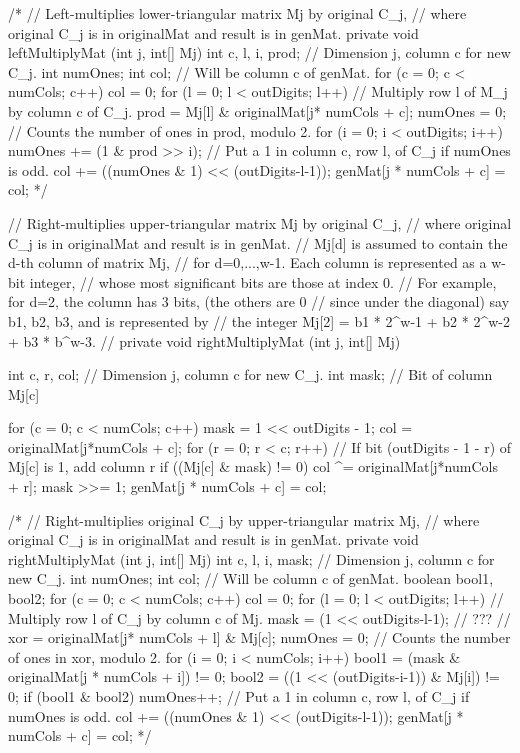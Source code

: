 \begin{code}
\begin{hide}
/*
   // Left-multiplies lower-triangular matrix Mj by original C_j,
   // where original C_j is in originalMat and result is in genMat.
   private void leftMultiplyMat (int j, int[] Mj) {
      int c, l, i, prod;    // Dimension j, column c for new C_j.
      int numOnes;
      int col;             // Will be column c of genMat.
      for (c = 0; c < numCols; c++) {
         col = 0;
         for (l = 0; l < outDigits; l++) {
            // Multiply row l of M_j by column c of C_j.
            prod = Mj[l] & originalMat[j* numCols + c];
            numOnes = 0;   // Counts the number of ones in prod, modulo 2.
            for (i = 0; i < outDigits; i++)
               numOnes += (1 & prod >> i);
            // Put a 1 in column c, row l, of C_j if numOnes is odd.
            col += ((numOnes & 1) << (outDigits-l-1));
         }
         genMat[j * numCols + c] = col;
      }
   }
*/

   // Right-multiplies upper-triangular matrix Mj by original C_j,
   // where original C_j is in originalMat and result is in genMat.
   // Mj[d] is assumed to contain the d-th column of matrix Mj,
   // for d=0,...,w-1. Each column is represented as a w-bit integer,
   // whose most significant bits are those at index 0.
   // For example, for d=2, the column has 3 bits, (the others are 0
   // since under the diagonal) say b1, b2, b3, and is represented by
   // the integer Mj[2] = b1 * 2^{w-1} + b2 * 2^{w-2} + b3 * b^{w-3}.
   //
   private void rightMultiplyMat (int j, int[] Mj) {
      int c, r, col;       // Dimension j, column c for new C_j.
      int mask;            // Bit of column Mj[c]

      for (c = 0; c < numCols; c++) {
         mask = 1 << outDigits - 1;
         col = originalMat[j*numCols + c];
         for (r = 0; r < c; r++) {
            // If bit (outDigits - 1 - r) of Mj[c] is 1, add column r
            if ((Mj[c] & mask) != 0)
               col ^= originalMat[j*numCols + r];
            mask >>= 1;
         }
         genMat[j * numCols + c] = col;
      }
   }

/*
   // Right-multiplies original C_j by upper-triangular matrix Mj,
   // where original C_j is in originalMat and result is in genMat.
   private void rightMultiplyMat (int j, int[] Mj) {
      int c, l, i, mask;    // Dimension j, column c for new C_j.
      int numOnes;
      int col;             // Will be column c of genMat.
      boolean bool1, bool2;
      for (c = 0; c < numCols; c++) {
         col = 0;
         for (l = 0; l < outDigits; l++) {
            // Multiply row l of C_j by column c of Mj.
            mask = (1 << outDigits-l-1);   //  ???
            // xor = originalMat[j* numCols + l] & Mj[c];
            numOnes = 0;   // Counts the number of ones in xor, modulo 2.
            for (i = 0; i < numCols; i++) {
               bool1 = (mask & originalMat[j * numCols + i]) != 0;
               bool2 = ((1 << (outDigits-i-1)) & Mj[i]) != 0;
               if (bool1 & bool2) numOnes++;
            }
            // Put a 1 in column c, row l, of C_j if numOnes is odd.
            col += ((numOnes & 1) << (outDigits-l-1));
         }
         genMat[j * numCols + c] = col;
      }
   }
*/


\end{hide}
\end{code}
